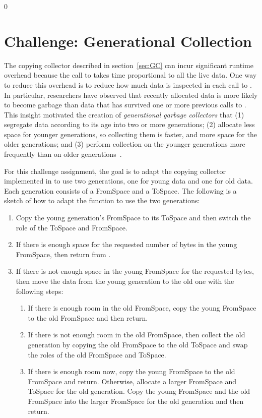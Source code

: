\documentclass[7x10]{TimesAPriori_MIT}%
\def\racketEd{0}
\providecommand{\BookEdition}{1}
\let\edition\BookEdition
\numberwithin{theorem}{chapter}
\numberwithin{definition}{chapter}
\numberwithin{equation}{chapter}
\begin{document}
{\if\edition\racketEd
\section{Challenge: Generational Collection}

The copying collector described in section~\ref{sec:GC} can incur
significant runtime overhead because the call to  takes
time proportional to all the live data. One way to reduce this
overhead is to reduce how much data is inspected in each call to
. In particular, researchers have observed that recently
allocated data is more likely to become garbage than data that has
survived one or more previous calls to . This insight
motivated the creation of \emph{generational garbage collectors}
 that
(1) segregate data according to its age into two or more generations;
(2) allocate less space for younger generations, so collecting them is
faster, and more space for the older generations; and (3) perform
collection on the younger generations more frequently than on older
generations~\citep{Wilson:1992fk}.

For this challenge assignment, the goal is to adapt the copying
collector implemented in  to use two generations, one
for young data and one for old data. Each generation consists of a
FromSpace and a ToSpace. The following is a sketch of how to adapt the
 function to use the two generations:

\begin{enumerate}
\item Copy the young generation's FromSpace to its ToSpace and then
  switch the role of the ToSpace and FromSpace.
\item If there is enough space for the requested number of bytes in
  the young FromSpace, then return from .
\item If there is not enough space in the young FromSpace for the
  requested bytes, then move the data from the young generation to the
  old one with the following steps:
  \begin{enumerate}
  \item[a.] If there is enough room in the old FromSpace, copy the young
    FromSpace to the old FromSpace and then return.
  \item[b.] If there is not enough room in the old FromSpace, then collect
    the old generation by copying the old FromSpace to the old ToSpace
    and swap the roles of the old FromSpace and ToSpace.
  \item[c.] If there is enough room now, copy the young FromSpace to the
    old FromSpace and return. Otherwise, allocate a larger FromSpace
    and ToSpace for the old generation.  Copy the young FromSpace and
    the old FromSpace into the larger FromSpace for the old
    generation and then return.
  \end{enumerate}
\end{enumerate}

}
\end{document}
